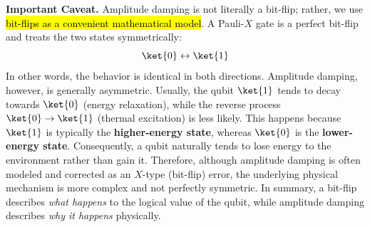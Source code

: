\textcolor{DarkOrange3}{ \textbf{Important Caveat.}} Amplitude damping is not literally a bit-flip; rather, we use \hl{bit-flips as a convenient mathematical model}. A Pauli-$X$ gate is a perfect bit-flip and treats the two states symmetrically:
\begin{equation*}
    \ket{0} \leftrightarrow \ket{1}
\end{equation*}
In other words, the behavior is identical in both directions. Amplitude damping, however, is generally asymmetric. Usually, the qubit $\ket{1}$ tends to decay towards $\ket{0}$ (energy relaxation), while the reverse process $\ket{0}\rightarrow\ket{1}$ (thermal excitation) is less likely. This happens because $\ket{1}$ is typically the \textbf{higher-energy state}, whereas $\ket{0}$ is the \textbf{lower-energy state}. Consequently, a qubit naturally tends to lose energy to the environment rather than gain it. Therefore, although amplitude damping is often modeled and corrected as an $X$-type (bit-flip) error, the underlying physical mechanism is more complex and not perfectly symmetric. In summary, a bit-flip describes \emph{what happens} to the logical value of the qubit, while amplitude damping describes \emph{why it happens} physically.